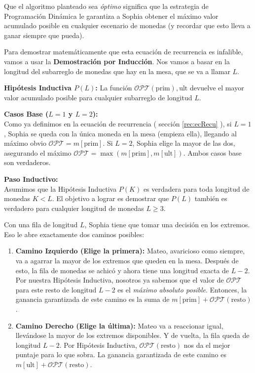 Que el algoritmo planteado sea \textit{óptimo} significa que la estrategia de Programación Dinámica le garantiza a Sophia obtener el máximo valor acumulado posible en cualquier escenario de monedas (y recordar que esto lleva a ganar siempre que pueda).

Para demostrar matemáticamente que esta ecuación de recurrencia es infalible, vamos a usar la \textbf{Demostración por Inducción}. Nos vamos a basar en la longitud del subarreglo de monedas que hay en la mesa, que se va a llamar $L$.

\textbf{Hipótesis Inductiva $P(L)$:} La función $\mathcal{OPT}(\text{prim}), \text{ult}$ devuelve el mayor valor acumulado posible para cualquier subarreglo de longitud $L$.

\vspace{1ex}
\noindent\textbf{Casos Base ($L=1$ y $L=2$): }
\\
Como ya definimos en la ecuación de recurrencia ( sección \ref{rec:ecRecu} ), si $L=1$, Sophia se queda con la única moneda en la mesa (empieza ella), llegando al máximo obvio $\mathcal{OPT} = m[\text{prim}]$. Si $L=2$, Sophia elige la mayor de las dos, asegurando el máximo $\mathcal{OPT} = \max(m[\text{prim}], m[\text{ult}])$. Ambos casos base son verdaderos.

\vspace{1ex}
\noindent\textbf{Paso Inductivo: }
\\
Asumimos que la Hipótesis Inductiva $P(K)$ es verdadera para toda longitud de monedas $K < L$. El objetivo a lograr es demostrar que $P(L)$ también es verdadero para cualquier longitud de monedas $L \ge 3$.

Con una fila de longitud $L$, Sophia tiene que tomar una decisión en los extremos. Eso le abre exactamente dos caminos posibles: 
\begin{enumerate}
    \item \textbf{Camino Izquierdo (Elige la primera):} Mateo, avaricioso como siempre, va a agarrar la mayor de los extremos que queden en la mesa. Después de esto, la fila de monedas se achicó y ahora tiene una longitud exacta de $L-2$. Por nuestra Hipótesis Inductiva, nosotros ya sabemos que el valor de $\mathcal{OPT}$ para este resto de longitud $L-2$ es el \textit{máximo absoluto posible}. Entonces, la ganancia garantizada de este camino es la suma de $m[\text{prim}] + \mathcal{OPT}(\text{resto})$.
    \item \textbf{Camino Derecho (Elige la última):} Mateo va a reaccionar igual, llevándose la mayor de los extremos disponibles. Y de vuelta, la fila queda de longitud $L-2$. Por Hipótesis Inductiva, $\mathcal{OPT}(\text{resto})$ nos da el mejor puntaje para lo que sobra. La ganancia garantizada de este camino es $m[\text{ult}] + \mathcal{OPT}(\text{resto})$.
\end{enumerate}

